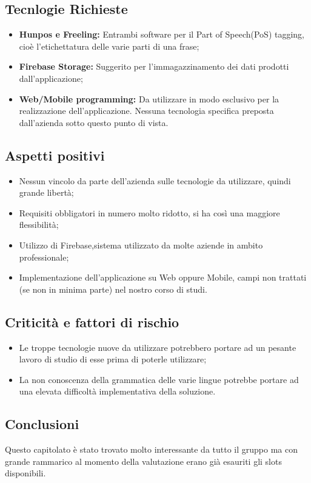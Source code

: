 \subsection{Tecnlogie Richieste}
\begin{itemize}
	\item \textbf{Hunpos e Freeling: } Entrambi software per il Part of Speech(PoS) tagging, cioè l'etichettatura delle varie parti di una frase;
	\item \textbf{Firebase Storage: }Suggerito per l'immagazzinamento dei dati prodotti dall'applicazione;
	\item \textbf{Web/Mobile programming: }Da utilizzare in modo esclusivo per la realizzazione dell'applicazione. Nessuna tecnologia specifica preposta dall'azienda sotto questo punto di vista.
\end{itemize}
\subsection{Aspetti positivi}
\begin{itemize}
	\item Nessun vincolo da parte dell'azienda sulle tecnologie da utilizzare, quindi grande libertà;
	\item Requisiti obbligatori in numero molto ridotto, si ha così una maggiore flessibilità;
	\item Utilizzo di Firebase,sistema utilizzato da molte aziende in ambito professionale;
	\item Implementazione dell'applicazione su Web oppure Mobile, campi non trattati (se non in minima parte) nel nostro corso di studi. 
\end{itemize}
\subsection{Criticità e fattori di rischio}
\begin{itemize}
\item Le troppe tecnologie nuove da utilizzare potrebbero portare ad un pesante lavoro di studio di esse prima di poterle utilizzare;
\item La non conoscenza della grammatica delle varie lingue potrebbe portare ad una elevata difficoltà implementativa della soluzione.
\end{itemize}
\subsection{Conclusioni}
Questo capitolato è stato trovato molto interessante da tutto il gruppo ma con grande rammarico al momento della valutazione erano già esauriti gli slots disponibili.